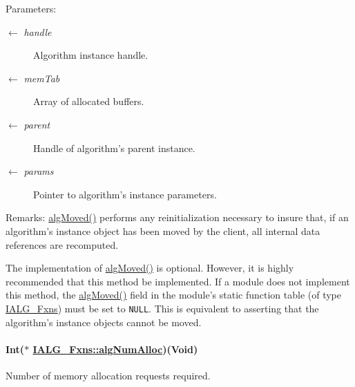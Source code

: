 \begin{Desc}
\item[Parameters:]
\begin{description}
\item[\mbox{$\leftarrow$} {\em handle}]Algorithm instance handle. \item[\mbox{$\leftarrow$} {\em mem\-Tab}]Array of allocated buffers. \item[\mbox{$\leftarrow$} {\em parent}]Handle of algorithm's parent instance. \item[\mbox{$\leftarrow$} {\em params}]Pointer to algorithm's instance parameters.\end{description}
\end{Desc}
\begin{Desc}
\item[Remarks:]\hyperlink{struct_i_a_l_g___fxns_5456c5087825b808e18000c551a66ef1}{alg\-Moved()} performs any reinitialization necessary to insure that, if an algorithm's instance object has been moved by the client, all internal data references are recomputed.

The implementation of \hyperlink{struct_i_a_l_g___fxns_5456c5087825b808e18000c551a66ef1}{alg\-Moved()} is optional. However, it is highly recommended that this method be implemented. If a module does not implement this method, the \hyperlink{struct_i_a_l_g___fxns_5456c5087825b808e18000c551a66ef1}{alg\-Moved()} field in the module's static function table (of type \hyperlink{struct_i_a_l_g___fxns}{IALG\_\-Fxns}) must be set to {\tt NULL}. This is equivalent to asserting that the algorithm's instance objects cannot be moved. \end{Desc}
\hypertarget{struct_i_a_l_g___fxns_098c1ca275465bb4acc1d3d0cf060160}{
\paragraph[algNumAlloc]{\setlength{\rightskip}{0pt plus 5cm}Int($\ast$ \hyperlink{struct_i_a_l_g___fxns_098c1ca275465bb4acc1d3d0cf060160}{IALG\_\-Fxns::alg\-Num\-Alloc})(Void)}\hfill}
\label{struct_i_a_l_g___fxns_098c1ca275465bb4acc1d3d0cf060160}


Number of memory allocation requests required. 

